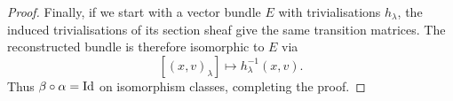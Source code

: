 \documentclass[12pt,a4paper]{article}
\begin{document}
\begin{proof}
Finally, if we start with a vector bundle $E$ with
trivialisations $h_\lambda$, the induced trivialisations
of its section sheaf give the same transition matrices.
The reconstructed bundle is therefore isomorphic to $E$
via
\[
    [(x,v)_\lambda]\longmapsto h_\lambda^{-1}(x,v).
\]
Thus $\beta\circ\alpha=\operatorname{Id}$ on isomorphism classes,
completing the proof.

\end{proof}
\end{document}
